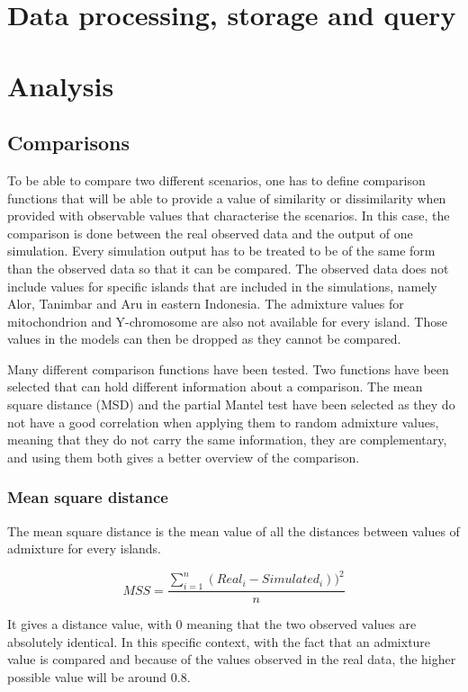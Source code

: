 \documentclass[a4paper,12pt]{report}
\begin{document}
\section{Data processing, storage and query}


\section{Analysis}


\subsection{Comparisons}
To be able to compare two different scenarios, one has to define comparison functions that will be able to provide a value of similarity or dissimilarity when provided with observable values that characterise the scenarios. In this case, the comparison is done between the real observed data and the output of one simulation.
Every simulation output has to be treated to be of the same form than the observed data so that it can be compared. The observed data does not include values for specific islands that are included in the simulations, namely Alor, Tanimbar and Aru in eastern Indonesia. The admixture values for mitochondrion and Y-chromosome are also not available for every island.
Those values in the models can then be dropped as they cannot be compared.

Many different comparison functions have been tested. Two functions have been selected that can hold different information about a comparison. The mean square distance (MSD) and the partial Mantel test have been selected as they do not have a good correlation when applying them to random admixture values, meaning that they do not carry the same information, they are complementary, and using them both gives a better overview of the comparison.

\subsubsection{Mean square distance}
The mean square distance is the mean value of all the distances between values of admixture for every islands.

\begin{equation}
MSS = \frac{\sum\limits_{i=1}^{n} (Real_i - Simulated_i)) ^ 2}{n}
\end{equation}

It gives a distance value, with 0 meaning that the two observed values are absolutely identical. In this specific context, with the fact that an admixture value is compared and because of the values observed in the real data, the higher possible value will be around $0.8$.
\end{document}
